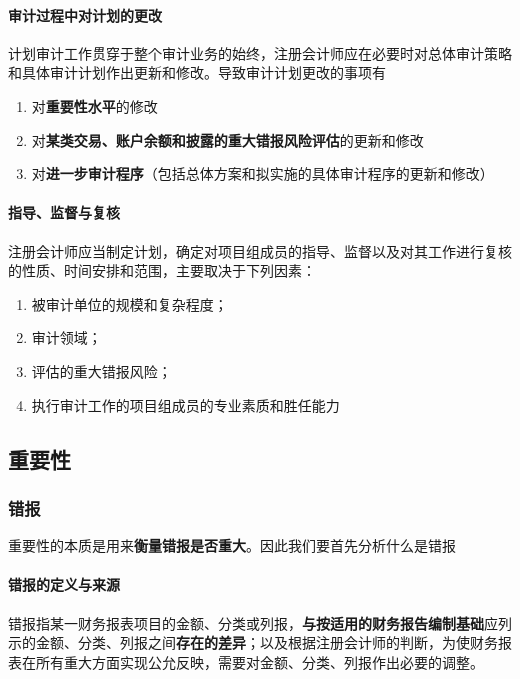\documentclass[UTF8,12pt]{ctexart}
\numberwithin{equation}{section} %
\numberwithin{figure}{section}
\numberwithin{table}{section}
\begin{document}
	\paragraph{审计过程中对计划的更改}
	计划审计工作贯穿于整个审计业务的始终，注册会计师应在必要时对总体审计策略和具体审计计划作出更新和修改。导致审计计划更改的事项有
	\begin{enumerate}
		\item 对\textbf{重要性水平}的修改
		
		\item 对\textbf{某类交易、账户余额和披露的重大错报风险评估}的更新和修改
		
		\item 对\textbf{进一步审计程序}（包括总体方案和拟实施的具体审计程序的更新和修改）
	\end{enumerate}
	
	\paragraph{指导、监督与复核}
	注册会计师应当制定计划，确定对项目组成员的指导、监督以及对其工作进行复核的性质、时间安排和范围，主要取决于下列因素：
	\begin{enumerate}
		\item 被审计单位的规模和复杂程度；
		
		\item 审计领域；
		
		\item 评估的重大错报风险；
		
		\item 执行审计工作的项目组成员的专业素质和胜任能力
	\end{enumerate}

	
	\subsection{重要性}
	\subsubsection{错报}
	重要性的本质是用来\textbf{衡量错报是否重大}。因此我们要首先分析什么是错报
	
	\paragraph{错报的定义与来源}
	错报指某一财务报表项目的金额、分类或列报，\textbf{与按适用的财务报告编制基础}应列示的金额、分类、列报之间\textbf{存在的差异}；以及根据注册会计师的判断，为使财务报表在所有重大方面实现公允反映，需要对金额、分类、列报作出必要的调整。
	
\end{document}
